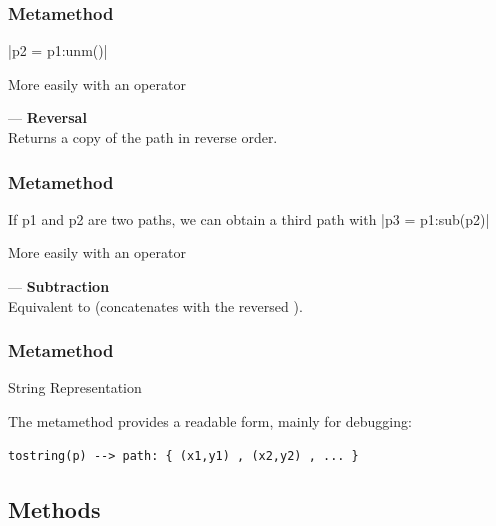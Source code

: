 \subsubsection{Metamethod }
\label{ssub:metamethod_sub}
|p2 = p1:unm()|

 More easily with an operator

   — \textbf{Reversal} \\
  Returns a copy of the path in reverse order.

\subsubsection{Metamethod }
\label{ssub:metamethod_unm}
If p1 and p2 are two paths, we can obtain a third path with
|p3 = p1:sub(p2)|

 More easily with an operator

   — \textbf{Subtraction} \\
  Equivalent to  (concatenates  with the reversed ).

\subsubsection{Metamethod }
\label{ssub:metamethod_tostring}
String Representation

The  metamethod provides a readable form, mainly for debugging:

\begin{verbatim}
tostring(p) --> path: { (x1,y1) , (x2,y2) , ... }
\end{verbatim}



\subsection{Methods}

